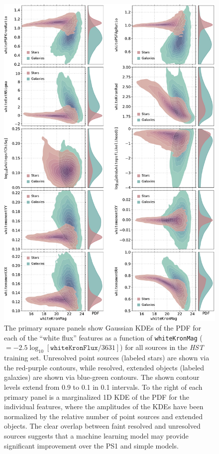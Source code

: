 \documentclass[twocolumn, dvipdfmx]{aastex62}
\begin{document}
\begin{CJK*}{UTF8}{gbsn}
\begin{figure}[htb]
 \centering
  \includegraphics[width=5.75in]{./Figures/whiteFeatures.pdf}
  \caption{
  The primary square panels show Gaussian KDEs of the PDF for each of the
  ``white flux'' features as a function of \texttt{whiteKronMag}
  ($=-2.5\log_{10}[\mathtt{whiteKronFlux}/3631]$) for all sources in the
  \textit{HST} training set. Unresolved point sources (labeled stars) are
  shown via the red-purple contours, while resolved, extended objects
  (labeled galaxies) are shown via blue-green contours. The shown contour
  levels extend from 0.9 to 0.1 in 0.1 intervals. To the right of each
  primary panel is a marginalized 1D KDE of the PDF for the individual
  features, where the amplitudes of the KDEs have been normalized by the
  relative number of point sources and extended objects. The clear overlap
  between faint resolved and unresolved sources suggests that a machine
  learning model may provide significant improvement over the PS1 and simple
  models.}
  \label{fig:features}
\end{figure}


\end{CJK*}
\end{document}

